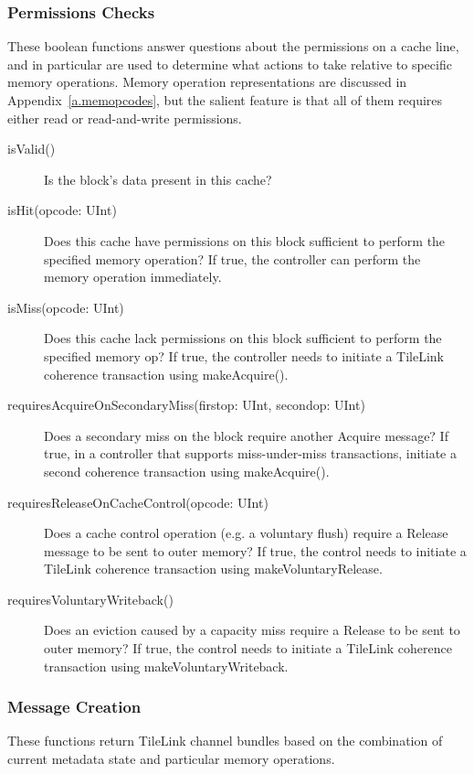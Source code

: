 \subsubsection{Permissions Checks}

These boolean functions answer questions about the permissions on a cache line, and in particular are used to determine what actions to take relative to specific memory operations.
Memory operation representations are discussed in Appendix~\ref{a.memopcodes}, but the salient feature is that
all of them requires either read or read-and-write permissions.

\begin{description}
\item[isValid()]
Is the block's data present in this cache?
\item[isHit(opcode: UInt)]
Does this cache have permissions on this block sufficient to perform the specified memory operation?
If true, the controller can perform the memory operation immediately.
\item[isMiss(opcode: UInt)]
Does this cache lack permissions on this block sufficient to perform the specified memory op?
If true, the controller needs to initiate a TileLink coherence transaction using makeAcquire().
\item[requiresAcquireOnSecondaryMiss(firstop: UInt, secondop: UInt)]
Does a secondary miss on the block require another Acquire message?
If true, in a controller that supports miss-under-miss transactions, initiate a second coherence transaction using makeAcquire().
\item[requiresReleaseOnCacheControl(opcode: UInt)]
Does a cache control operation (e.g. a voluntary flush) require a Release message to be sent to outer memory?
If true, the control needs to initiate a TileLink coherence transaction using makeVoluntaryRelease.
\item[requiresVoluntaryWriteback()]
Does an eviction caused by a capacity miss require a Release to be sent to outer memory?
If true, the control needs to initiate a TileLink coherence transaction using makeVoluntaryWriteback.
\end{description}


\subsubsection{Message Creation}

These functions return TileLink channel bundles based on the combination of current metadata state and particular memory operations.

